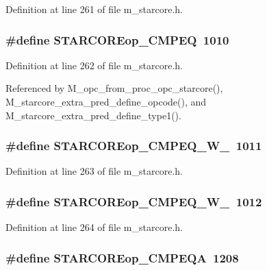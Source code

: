 Definition at line 261 of file m\_\-starcore.h.
\subsubsection{\setlength{\rightskip}{0pt plus 5cm}\#define STARCOREop\_\-CMPEQ~1010}\label{m__starcore_8h_5e95f29ed91e56f916021b25c47cc872}




Definition at line 262 of file m\_\-starcore.h.

Referenced by M\_\-opc\_\-from\_\-proc\_\-opc\_\-starcore(), M\_\-starcore\_\-extra\_\-pred\_\-define\_\-opcode(), and M\_\-starcore\_\-extra\_\-pred\_\-define\_\-type1().
\subsubsection{\setlength{\rightskip}{0pt plus 5cm}\#define STARCOREop\_\-CMPEQ\_\-W\_~1011}\label{m__starcore_8h_502f02fb7580cdc6f55b8e6b3424db00}




Definition at line 263 of file m\_\-starcore.h.
\subsubsection{\setlength{\rightskip}{0pt plus 5cm}\#define STARCOREop\_\-CMPEQ\_\-W\_~1012}\label{m__starcore_8h_be3c5a8522e8efb3f87f5ff111a1ef54}




Definition at line 264 of file m\_\-starcore.h.
\subsubsection{\setlength{\rightskip}{0pt plus 5cm}\#define STARCOREop\_\-CMPEQA~1208}\label{m__starcore_8h_7ede0e00227899f422001e153288487d}




